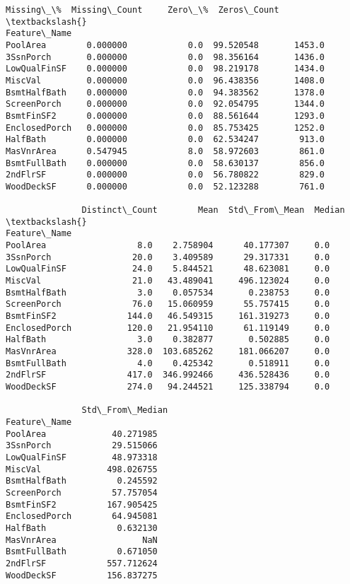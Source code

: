 \documentclass[11pt]{article}
\newcommand{\prompt}[4]{
        \llap{{\color{#2}[#3]: #4}}\vspace{-1.25em}
    }
\begin{document}
            \begin{tcolorbox}[breakable, boxrule=.5pt, size=fbox, pad at break*=1mm, opacityfill=0]
\prompt{Out}{outcolor}{23}{\hspace{3.5pt}}
\begin{Verbatim}[commandchars=\\\{\}]
               Missing\_\%  Missing\_Count     Zero\_\%  Zeros\_Count  \textbackslash{}
Feature\_Name
PoolArea        0.000000            0.0  99.520548       1453.0
3SsnPorch       0.000000            0.0  98.356164       1436.0
LowQualFinSF    0.000000            0.0  98.219178       1434.0
MiscVal         0.000000            0.0  96.438356       1408.0
BsmtHalfBath    0.000000            0.0  94.383562       1378.0
ScreenPorch     0.000000            0.0  92.054795       1344.0
BsmtFinSF2      0.000000            0.0  88.561644       1293.0
EnclosedPorch   0.000000            0.0  85.753425       1252.0
HalfBath        0.000000            0.0  62.534247        913.0
MasVnrArea      0.547945            8.0  58.972603        861.0
BsmtFullBath    0.000000            0.0  58.630137        856.0
2ndFlrSF        0.000000            0.0  56.780822        829.0
WoodDeckSF      0.000000            0.0  52.123288        761.0

               Distinct\_Count        Mean  Std\_From\_Mean  Median  \textbackslash{}
Feature\_Name
PoolArea                  8.0    2.758904      40.177307     0.0
3SsnPorch                20.0    3.409589      29.317331     0.0
LowQualFinSF             24.0    5.844521      48.623081     0.0
MiscVal                  21.0   43.489041     496.123024     0.0
BsmtHalfBath              3.0    0.057534       0.238753     0.0
ScreenPorch              76.0   15.060959      55.757415     0.0
BsmtFinSF2              144.0   46.549315     161.319273     0.0
EnclosedPorch           120.0   21.954110      61.119149     0.0
HalfBath                  3.0    0.382877       0.502885     0.0
MasVnrArea              328.0  103.685262     181.066207     0.0
BsmtFullBath              4.0    0.425342       0.518911     0.0
2ndFlrSF                417.0  346.992466     436.528436     0.0
WoodDeckSF              274.0   94.244521     125.338794     0.0

               Std\_From\_Median
Feature\_Name
PoolArea             40.271985
3SsnPorch            29.515066
LowQualFinSF         48.973318
MiscVal             498.026755
BsmtHalfBath          0.245592
ScreenPorch          57.757054
BsmtFinSF2          167.905425
EnclosedPorch        64.945081
HalfBath              0.632130
MasVnrArea                 NaN
BsmtFullBath          0.671050
2ndFlrSF            557.712624
WoodDeckSF          156.837275
\end{Verbatim}
\end{tcolorbox}
        
\end{document}
